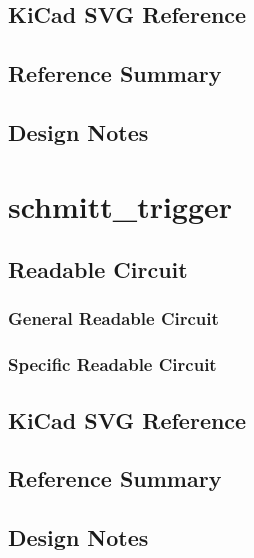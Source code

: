 \documentclass[11pt]{article}
\begin{document}
\subsection{KiCad SVG Reference}
\subsection{Reference Summary}

\subsection{Design Notes}

\clearpage
\section{schmitt\_trigger}
\subsection{Readable Circuit}
\subsubsection{General Readable Circuit}

\subsubsection{Specific Readable Circuit}

\subsection{KiCad SVG Reference}
\subsection{Reference Summary}

\subsection{Design Notes}

\clearpage
\end{document}
